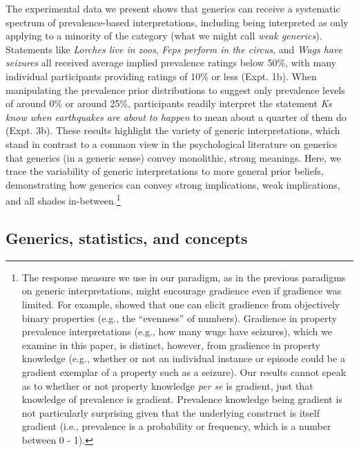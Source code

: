 \documentclass[floatsintext,doc]{apa6}
\let\rmarkdownfootnote\footnote%
\def\footnote{\protect\rmarkdownfootnote}
\begin{document}
%
The experimental data we present shows that generics can receive a systematic spectrum of prevalence-based interpretations, including being interpreted as only applying to a minority of the category (what we might call \emph{weak generics}). 
Statements like \emph{Lorches live in zoos}, \emph{Feps perform in the circus}, and \emph{Wugs have seizures} all received average implied prevalence ratings below 50\%, with many individual participants providing ratings of 10\% or less (Expt. 1b).
When manipulating the prevalence prior distributions to suggest only prevalence levels of around 0\% or around 25\%, participants readily interpret the statement \emph{Ks know when earthquakes are about to happen} to mean about a quarter of them do (Expt. 3b).
These results highlight the variety of generic interpretations, which stand in contrast to a common view in the psychological literature on generics that generics (in a generic sense) convey monolithic, strong meanings.
Here, we trace the variability of generic interpretations to more general prior beliefs, demonstrating how generics can convey strong implications, weak implications, and all shades in-between.\footnote{
The response measure we use in our paradigm, as in the previous paradigms on generic interpretations, might encourage gradience even if gradience was limited.
For example,  showed that one can elicit gradience from objectively binary properties (e.g., the ``evenness'' of numbers).
Gradience in property prevalence interpretations (e.g., how many wugs have seizures), which we examine in this paper, is distinct, however, from gradience in property knowledge (e.g., whether or not an individual instance or episode could be a gradient exemplar of a property such as a seizure). Our results cannot speak as to whether or not property knowledge \emph{per se} is gradient, just that knowledge of prevalence is gradient. Prevalence knowledge being gradient is not particularly surprising given that the underlying construct is itself gradient (i.e., prevalence is a probability or frequency, which is a number between 0 - 1). 
}

\subsection{Generics, statistics, and concepts}
\end{document}
